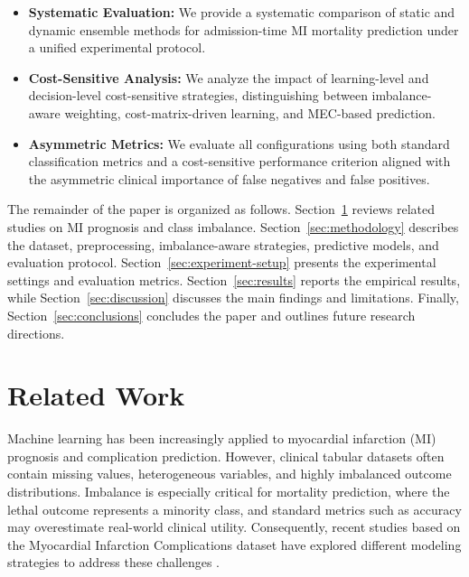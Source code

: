 \documentclass[conference]{IEEEtran}
\begin{document}
\begin{itemize}
    \item \textbf{Systematic Evaluation:} We provide a systematic comparison of static and dynamic ensemble methods for admission-time MI mortality prediction under a unified experimental protocol.
    \item \textbf{Cost-Sensitive Analysis:} We analyze the impact of learning-level and decision-level cost-sensitive strategies, distinguishing between imbalance-aware weighting, cost-matrix-driven learning, and MEC-based prediction.
    \item \textbf{Asymmetric Metrics:} We evaluate all configurations using both standard classification metrics and a cost-sensitive performance criterion aligned with the asymmetric clinical importance of false negatives and false positives.
\end{itemize}

The remainder of the paper is organized as follows. Section~\ref{sec:related-works} reviews related studies on MI prognosis and class imbalance. Section~\ref{sec:methodology} describes the dataset, preprocessing, imbalance-aware strategies, predictive models, and evaluation protocol. Section~\ref{sec:experiment-setup} presents the experimental settings and evaluation metrics. Section~\ref{sec:results} reports the empirical results, while Section~\ref{sec:discussion} discusses the main findings and limitations. Finally, Section~\ref{sec:conclusions} concludes the paper and outlines future research directions.


\section{Related Work} \label{sec:related-works}
Machine learning has been increasingly applied to myocardial infarction (MI) prognosis and complication prediction. However, clinical tabular datasets often contain missing values, heterogeneous variables, and highly imbalanced outcome distributions. Imbalance is especially critical for mortality prediction, where the lethal outcome represents a minority class, and standard metrics such as accuracy may overestimate real-world clinical utility. Consequently, recent studies based on the Myocardial Infarction Complications dataset have explored different modeling strategies to address these challenges \cite{ghafari2023prediction, vicente2024explainablelightgbmapproachpredicting, NEWAZ2023101361}.
\end{document}
